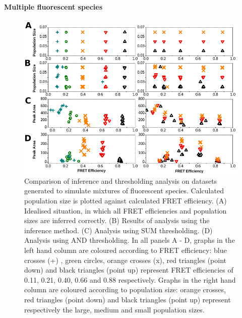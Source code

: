 \paragraph*{Multiple fluorescent species}

\begin{figure}
   \begin{center}
      \includegraphics*[trim=0.8cm 0cm 0cm 0cm, clip=true, width=6in]{inference/fig5_labelled_multi_fig.pdf}
      \caption{Comparison of inference and thresholding analysis on datasets generated to simulate mixtures of fluorescent species.  Calculated population size is plotted against calculated FRET efficiency.  (A) Idealised situation, in which all FRET efficiencies and population sizes are inferred correctly. (B) Results of analysis using the inference method. (C) Analysis using SUM thresholding. (D) Analysis using AND thresholding. In all panels A - D, graphs in the left hand column are coloured according to FRET efficiency: blue crosses (+) , green circles, orange crosses (x), red triangles (point down) and black triangles (point up) represent FRET efficiencies of 0.11, 0.21, 0.40, 0.66 and 0.88 respectively. Graphs in the right hand column are coloured according to population size: orange crosses, red triangles (point down) and black triangles (point up) represent respectively the large, medium and small population sizes.}
      \label{fig:fig5_synthetic_multi}
   \end{center}
\end{figure}


